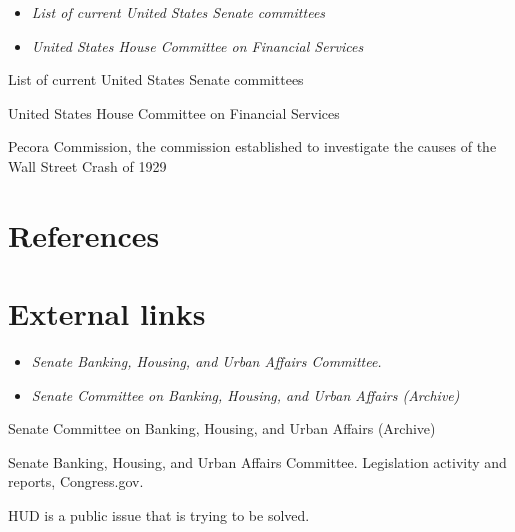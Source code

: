 \begin{itemize}
\item
  \emph{List of current United States Senate committees}
\item
  \emph{United States House Committee on Financial Services}
\end{itemize}

List of current United States Senate committees

United States House Committee on Financial Services

Pecora Commission, the commission established to investigate the causes
of the Wall Street Crash of 1929

\section{References}\label{references}

\section{External links}\label{external-links}

\begin{itemize}
\item
  \emph{Senate Banking, Housing, and Urban Affairs Committee.}
\item
  \emph{Senate Committee on Banking, Housing, and Urban Affairs
  (Archive)}
\end{itemize}

Senate Committee on Banking, Housing, and Urban Affairs (Archive)

Senate Banking, Housing, and Urban Affairs Committee. Legislation
activity and reports, Congress.gov.

HUD is a public issue that is trying to be solved.
